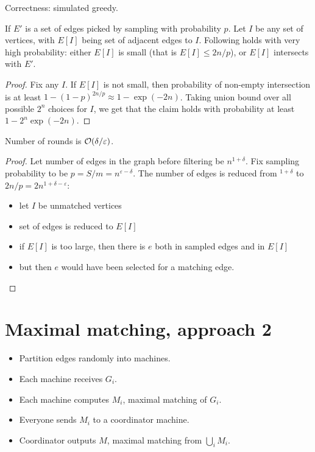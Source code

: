 \documentclass[11pt]{article}
\begin{document}
Correctness: simulated greedy. 
\begin{lemma}If $E'$ is a set of edges picked by sampling with probability $p$. Let $I$ be any set of vertices, with $E[I]$ being set of adjacent edges to $I$. Following holds with very high probability: either $E[I]$ is small (that is $E[I] \le 2n/p$), or $E[I]$ intersects with $E'$.
\end{lemma}
\begin{proof}
Fix any $I$. If $E[I]$ is not small, then probability of non-empty intersection is at least $1-(1-p)^{2n/p} \approx 1 - \exp(-2n)$. Taking union bound over all possible $2^n$ choices for $I$, we get that the claim holds with probability at least $1 - 2^n \exp(-2n)$.
\end{proof}
\begin{theorem}
Number of rounds is $\mathcal{O}(\delta/\varepsilon)$.
\end{theorem}
\begin{proof}
Let number of edges in the graph before filtering be $n^{1+\delta}$.
Fix sampling probability to be $p = S/m = n^{\varepsilon-\delta}$. The number of edges is reduced from $^{1+\delta}$ to $2n/p = 2n^{1+\delta-\varepsilon}$:
\begin{itemize}
\item let $I$ be unmatched vertices
\item set of edges is reduced to $E[I]$
\item if $E[I]$ is too large, then there is $e$ both in sampled edges and in $E[I]$
\item but then $e$ would have been selected for a matching edge.
\end{itemize}
\end{proof}

\section{Maximal matching, approach 2}
\begin{itemize}
\item Partition edges randomly into machines. 
\item Each machine receives $G_i$.
\item Each machine computes $M_i$, maximal matching of $G_i$.
\item Everyone sends $M_i$ to a coordinator machine.
\item Coordinator outputs $M$, maximal matching from $\bigcup_i M_i$.
\end{itemize}
\end{document}
